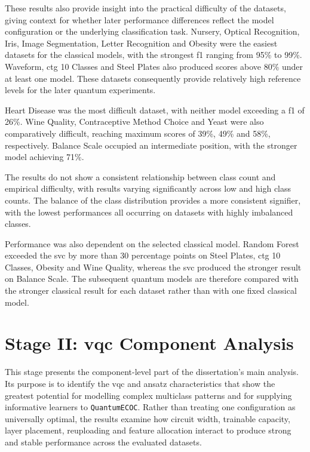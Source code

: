 \documentclass[]{UCD_CS_MSc_AAI_Report}
\begin{document}
These results also provide insight into the practical difficulty of the datasets, giving context for whether later performance differences reflect the model configuration or the underlying classification task. Nursery, Optical Recognition, Iris, Image Segmentation, Letter Recognition and Obesity were the easiest datasets for the classical models, with the strongest \acl{f1} ranging from 95\% to 99\%. Waveform, \acs{ctg} 10 Classes and Steel Plates also produced scores above 80\% under at least one model. These datasets consequently provide relatively high reference levels for the later quantum experiments.

Heart Disease was the most difficult dataset, with neither model exceeding a \acl{f1} of 26\%. Wine Quality, Contraceptive Method Choice and Yeast were also comparatively difficult, reaching maximum scores of 39\%, 49\% and 58\%, respectively. Balance Scale occupied an intermediate position, with the stronger model achieving 71\%.

The results do not show a consistent relationship between class count and empirical difficulty, with results varying significantly across low and high class counts. The balance of the class distribution provides a more consistent signifier, with the lowest performances all occurring on datasets with highly imbalanced classes.

Performance was also dependent on the selected classical model. Random Forest exceeded the \ac{svc} by more than 30 percentage points on Steel Plates, \acs{ctg} 10 Classes, Obesity and Wine Quality, whereas the \ac{svc} produced the stronger result on Balance Scale. The subsequent quantum models are therefore compared with the stronger classical result for each dataset rather than with one fixed classical model.

\section{Stage II: \acs*{vqc} Component Analysis}
\label{sec:results-vqc}

This stage presents the component-level part of the dissertation's main analysis. Its purpose is to identify the \ac{vqc} and ansatz characteristics that show the greatest potential for modelling complex multiclass patterns and for supplying informative learners to \texttt{QuantumECOC}. Rather than treating one configuration as universally optimal, the results examine how circuit width, trainable capacity, layer placement, reuploading and feature allocation interact to produce strong and stable performance across the evaluated datasets.
\end{document}
